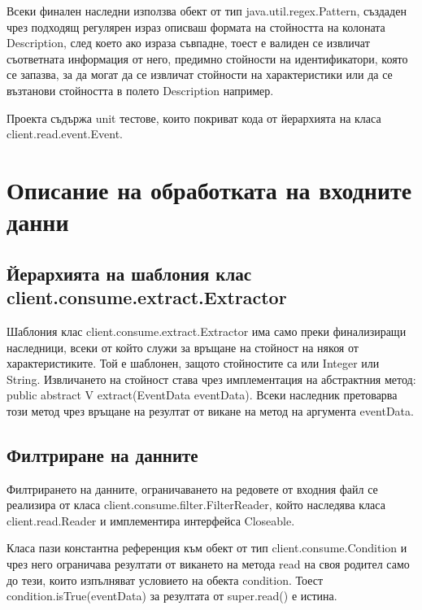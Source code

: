 \documentclass[a4paper, 12pt]{article}
\begin{document}
Всеки финален наследни използва обект от тип java.util.regex.Pattern,
създаден чрез подходящ регулярен израз описваш формата на стойността на колоната Description,
след което ако израза съвпадне, тоест е валиден се извличат съответната информация от него,
предимно стойности на идентификатори, която се запазва,
за да могат да се извличат стойности на характеристики или да се възтанови стойността в полето Description например.

Проекта съдържа unit тестове, които покриват кода от йерархията на класа client.read.event.Event.

\section{Описание на обработката на входните данни}

\subsection{Йерархията на шаблония клас client.consume.extract.Extractor}
Шаблония клас client.consume.extract.Extractor има само преки финализиращи наследници,
всеки от който служи за връщане на стойност на някоя от характеристиките.
Той е шаблонен, защото стойностите са или Integer или String. 
Извличането на стойност става чрез имплементация на абстрактния метод: \\
public abstract V extract(EventData eventData).
Всеки наследник претоварва този метод чрез връщане на резултат от викане на метод на аргумента eventData.

\subsection{Филтриране на данните}
Филтрирането на данните, ограничаването на редовете от входния файл се реализира от класа client.consume.filter.FilterReader,
който наследява класа client.read.Reader и имплементира интерфейса Closeable.

Класа пази константна референция към обект от тип client.consume.Condition и чрез него ограничава резултати от викането на 
метода read на своя родител само до тези, които изпълняват условието на обекта condition.
Тоест condition.isTrue(eventData) за резултата от super.read() е истина.
\end{document}
